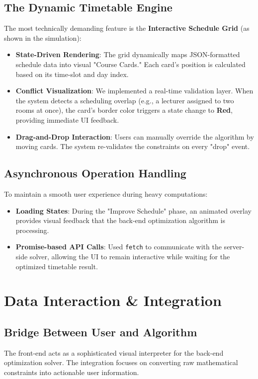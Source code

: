 \documentclass[11pt,a4paper]{article}
\begin{document}
\subsection{The Dynamic Timetable Engine}
The most technically demanding feature is the \textbf{Interactive Schedule Grid} (as shown in the simulation):
\begin{itemize}
    \item \textbf{State-Driven Rendering}: The grid dynamically maps JSON-formatted schedule data into visual "Course Cards." Each card’s position is calculated based on its time-slot and day index.
    \item \textbf{Conflict Visualization}: We implemented a real-time validation layer. When the system detects a scheduling overlap (e.g., a lecturer assigned to two rooms at once), the card's border color triggers a state change to \textbf{Red}, providing immediate UI feedback.
    \item \textbf{Drag-and-Drop Interaction}: Users can manually override the algorithm by moving cards. The system re-validates the constraints on every "drop" event.
\end{itemize}

\subsection{Asynchronous Operation Handling}
To maintain a smooth user experience during heavy computations:
\begin{itemize}
    \item \textbf{Loading States}: During the "Improve Schedule" phase, an animated overlay provides visual feedback that the back-end optimization algorithm is processing.
    \item \textbf{Promise-based API Calls}: Used \texttt{fetch} to communicate with the server-side solver, allowing the UI to remain interactive while waiting for the optimized timetable result.
\end{itemize}

\newpage

\section{Data Interaction \& Integration}

\subsection{Bridge Between User and Algorithm}
The front-end acts as a sophisticated visual interpreter for the back-end optimization solver. The integration focuses on converting raw mathematical constraints into actionable user information.
\end{document}
